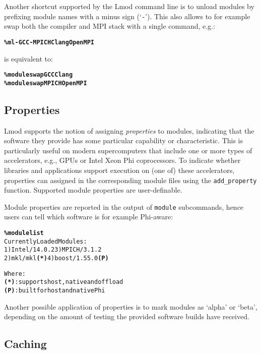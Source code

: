 Another shortcut supported by the Lmod command line is to unload modules by
prefixing module names with a minus sign (`\texttt{\small-}'). This also allows to
for example swap both the compiler and MPI stack with a single command, e.g.:
{\small
  \begin{alltt}
      \textbf{\% ml -GCC -MPICH Clang OpenMPI}\
  \end{alltt}
}
\noindent
is equivalent to:
{\small
  \begin{alltt}
      \textbf{\% module swap GCC Clang}
      \textbf{\% module swap MPICH OpenMPI}\
  \end{alltt}
}

\subsection{Properties}

Lmod supports the notion of assigning \emph{properties} to modules,
indicating that the software they provide has some particular capability or
characteristic. This is particularly useful on modern supercomputers that include
one or more types of accelerators, e.g., GPUs or Intel Xeon Phi coprocessors.
To indicate whether libraries and applications support execution on (one of) these
accelerators, properties can assigned in the corresponding module files
using the \texttt{\small add\_property} function. Supported module
properties are user-definable.

Module properties are reported in the output of \texttt{\small module} subcommands,
hence users can tell which software is for example Phi-aware:
{\small
\begin{alltt}
  \textbf{\% module list}
  Currently Loaded Modules:
    1) Intel/14.0.2       3) MPICH/3.1.2
    2) mkl/mkl      \textbf{(*)}   4) boost/1.55.0 \textbf{(P)}

  Where:
   \textbf{(*)}:  supports host, native and offload
   \textbf{(P)}:  built for host and native Phi
\end{alltt}
}
\noindent Another possible application of properties is to mark modules as `alpha'
or `beta', depending on the amount of testing the provided software builds have
received.

\subsection{Caching}

